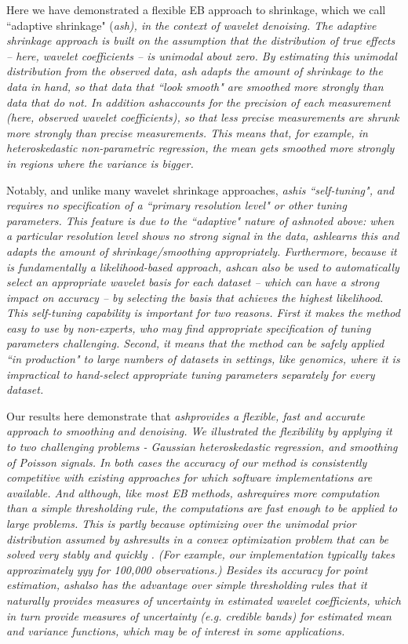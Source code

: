 \documentclass[12pt]{article}
\begin{document}
\def\ash{\it ash}

Here we have demonstrated a flexible EB approach to shrinkage, which we call ``adaptive shrinkage" (\ash), in the context of wavelet denoising. 
The adaptive shrinkage approach is built on the assumption that the distribution of
true effects -- here, wavelet coefficients -- is unimodal about zero. By estimating this unimodal distribution from the observed data, \ash 
adapts the amount of shrinkage to the data in hand, so that data that ``look smooth" are smoothed more strongly than data that do not. 
In addition \ash accounts for the precision of each measurement (here, observed wavelet coefficients), 
so that less precise measurements are shrunk more strongly than precise measurements. This means that, for example, in heteroskedastic non-parametric regression, 
the mean gets smoothed more strongly in regions where the variance is bigger. 

Notably, and unlike many wavelet shrinkage approaches, \ash is ``self-tuning", and requires no specification of a ``primary resolution level" \cite{}
or other tuning parameters. This feature is due to the ``adaptive" nature of \ash noted above: when a particular resolution level shows no strong signal
in the data, \ash learns this and adapts the amount of shrinkage/smoothing appropriately. Furthermore, because it is fundamentally a likelihood-based
approach, \ash can also be used to automatically select an appropriate wavelet basis for each dataset -- which can have a strong impact on accuracy --
by selecting the basis that achieves the highest likelihood. This self-tuning capability is important for two reasons.
First it makes the method easy to use by non-experts, who may find appropriate specification of tuning parameters challenging. Second, it means that the
method can be safely applied ``in production" to large numbers of datasets in settings, like genomics, where it is impractical to
hand-select appropriate tuning parameters separately for every dataset. 

Our results here demonstrate that \ash provides a flexible, fast and accurate approach to smoothing and denoising. We illustrated the flexibility by applying
it to two challenging problems - Gaussian heteroskedastic regression, and smoothing of Poisson signals. In both cases the accuracy of our method is
consistently competitive with existing approaches for which software implementations are available. And although, like most EB methods,
\ash requires more computation than a simple thresholding rule, the computations are fast enough to be applied to large problems. 
This is partly because
optimizing over the unimodal prior distribution assumed by \ash results in a convex optimization problem that can be solved very stably and quickly \cite{stephens:2016}.
(For example, our implementation typically takes approximately yyy for 100,000 observations.)
Besides its accuracy for point estimation, \ash also has the advantage over simple thresholding rules that it naturally provides measures of uncertainty in estimated
wavelet coefficients, which in turn provide measures of uncertainty (e.g. credible bands) for estimated mean and variance functions, which may be of interest in some applications.
\end{document}
